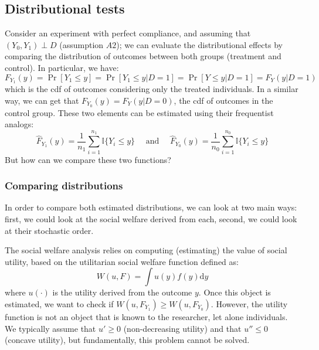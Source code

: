 \documentclass[12pt]{report}
\def\D{\mathrm{d}}
\def\D{\mathrm{d}}
\newcommand{\Prob}[1]{\operatorname{Pr}\left[#1\right]}
\def\D{\mathrm{d}}
\begin{document}
\subsection{Distributional tests}

Consider an experiment with perfect compliance, and assuming that $(Y_0, Y_1)\perp D$ (assumption $A2$); we can evaluate the distributional effects by comparing the distribution of outcomes between both groups (treatment and control). In particular, we have: $$F_{Y_1}(y) = \Prob{Y_1\leq y} = \Prob{Y_1\leq y\vert D = 1} = \Prob{Y\leq y\vert D = 1} = F_{Y}(y\vert D =1) $$ which is the cdf of outcomes considering only the treated individuals. In a similar way, we can get that $F_{Y_0}(y) = F_Y(y\vert D = 0)$, the cdf of outcomes in the control group. These two elements can be estimated using their frequentist analogs: $$\hat F_{Y_1}(y) = \frac{1}{n_1}\sum_{i=1}^{n_1} \mathbb{I}\{Y_i \leq y\} \quad \text{ and } \quad \hat F_{Y_0}(y) = \frac{1}{n_0}\sum_{i=1}^{n_0} \mathbb{I}\{Y_i \leq y\}$$
But how can we compare these two functions?

\subsubsection{Comparing distributions}

In order to compare both estimated distributions, we can look at two main ways: first, we could look at the social welfare derived from each, second, we could look at their stochastic order.

The social welfare analysis relies on computing (estimating) the value of social utility, based on the utilitarian social welfare function defined as: $$W(u, F) = \int u(y)f(y)\D y $$ where $u(\cdot)$ is the utility derived from the outcome $y$. Once this object is estimated, we want to check if $W(u, F_{Y_1})\geq W(u, F_{Y_0})$. However, the utility function is not an object that is known to the researcher, let alone individuals. We typically assume that $u'\geq 0$ (non-decreasing utility) and that $u''\leq 0$ (concave utility), but fundamentally, this problem cannot be solved.
\end{document}
